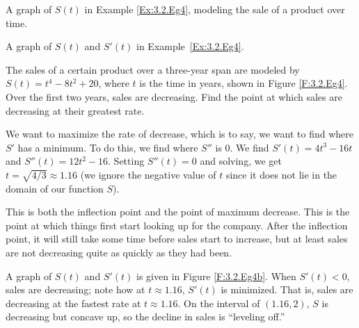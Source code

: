 \begin{marginfigure}[2cm]
\caption{A graph of $S(t)$ in Example \ref{Ex:3.2.Eg4}, modeling the sale of a product over time. }
\label{F:3.2.Eg4}
\end{marginfigure}

\begin{marginfigure}[0cm]
\caption{A graph of $S(t)$ and $S'(t)$ in Example~\ref{Ex:3.2.Eg4}.}
\label{F:3.2.Eg4b}
\end{marginfigure}

\begin{example} \label{Ex:3.2.Eg4}
The sales of a certain product over a three-year span are modeled by $S(t)= t^4-8t^2+20$, where $t$ is the time in years, shown in Figure \ref{F:3.2.Eg4}.  Over the first two years, sales are decreasing.  Find the point at which sales are decreasing at their greatest rate.

\solution We want to maximize the rate of decrease, which is to say, we want to find where $S'$ has a minimum.  To do this, we find where $S''$ is $0$.  We find $S'(t)=4t^3-16t$ and $S''(t)=12t^2-16$.  Setting $S''(t)=0$ and solving, we get $t=\sqrt{4/3}\approx 1.16$ (we ignore the negative value of $t$ since it does not lie in the domain of our function $S$).

This is both the inflection point and the point of maximum decrease.  This is the point at which things first start looking up for the company.  After the inflection point, it will still take some time before sales start to increase, but at least sales are not decreasing quite as quickly as they had been.

A graph of $S(t)$ and $S'(t)$ is given in Figure \ref{F:3.2.Eg4b}. When $S'(t)<0$, sales are decreasing; note how at $t\approx 1.16$, $S'(t)$ is minimized. That is, sales are decreasing at the fastest rate at $t\approx 1.16$.  On the interval of $(1.16,2)$, $S$ is decreasing but concave up, so the decline in sales is ``leveling off.''
\end{example}